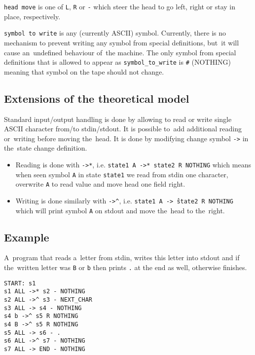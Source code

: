 \documentclass[english,shortabstract,mgr]{iithesis}
\begin{document}
\texttt{head move} is one of \texttt{L}, \texttt{R} or \texttt{-} which
steer the head to go left, right or stay in place, respectively.

\texttt{symbol to write} is any (currently ASCII) symbol. Currently, there
is no mechanism to prevent writing any symbol from special definitions,
but~it will cause an~undefined behaviour of~the machine. The only symbol
from special definitions that is allowed to appear as \texttt{symbol\_to\_write}
is \texttt{\#} (NOTHING) meaning that symbol on the tape should not change.

\subsection {Extensions of the theoretical model}

Standard input/output handling is done by allowing to read or write single
ASCII character from/to stdin/stdout. It is possible to~add additional
reading or~writing before moving the~head. It is done by modifying change
symbol \texttt{->} in the~state change definition.
\begin{itemize}
  \item Reading is done with \texttt{->*}, i.e. \texttt{state1 A ->* state2 R NOTHING}
        which means when seen symbol \texttt{A} in state \texttt{state1} we read
        from stdin one character, overwrite \texttt{A} to read value and move
        head one field right.
  \item Writing is done similarly with \texttt{->\^},
        i.e. \texttt{state1 A ->\^\ state2 R NOTHING} which will print symbol
        \texttt{A} on stdout and move the~head to the~right.
\end{itemize}

\subsection{Example}

A~program that reads a~letter from stdin, writes this letter into
stdout and if the~written letter was \texttt{B} or \texttt{b} then prints
\texttt{.} at the end as well, otherwise finishes.

\begin{verbatim}
START: s1
s1 ALL ->* s2 - NOTHING
s2 ALL ->^ s3 - NEXT_CHAR
s3 ALL -> s4 - NOTHING
s4 b ->^ s5 R NOTHING
s4 B ->^ s5 R NOTHING
s5 ALL -> s6 - .
s6 ALL ->^ s7 - NOTHING
s7 ALL -> END - NOTHING
\end{verbatim}
\end{document}
